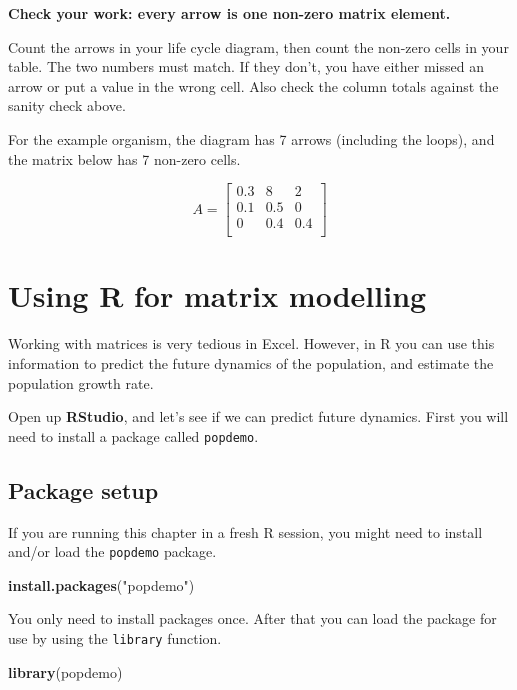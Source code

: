 \documentclass[
  a4paper]{book}
\newenvironment{Shaded}{\begin{snugshade}}{\end{snugshade}}
\newcommand{\FunctionTok}[1]{\textcolor[rgb]{0.13,0.29,0.53}{\textbf{#1}}}
\newcommand{\NormalTok}[1]{#1}
\newcommand{\StringTok}[1]{\textcolor[rgb]{0.31,0.60,0.02}{#1}}
\begin{document}
\textbf{Check your work: every arrow is one non-zero matrix element.}

Count the arrows in your life cycle diagram, then count the non-zero cells in your table. The two numbers must match. If they don't, you have either missed an arrow or put a value in the wrong cell. Also check the column totals against the sanity check above.

For the example organism, the diagram has 7 arrows (including the loops), and the matrix below has 7 non-zero cells.

\[
A = \begin{bmatrix}0.3&8&2 \\0.1&0.5&0 \\0&0.4&0.4 \\\end{bmatrix}
\]

\section{Using R for matrix modelling}\label{using-r-for-matrix-modelling}

Working with matrices is very tedious in Excel. However, in R you can use this information to predict the future dynamics of the population, and estimate the population growth rate.

Open up \textbf{RStudio}, and let's see if we can predict future dynamics. First you will need to install a package called \texttt{popdemo}.

\subsection{Package setup}\label{package-setup}

If you are running this chapter in a fresh R session, you might need to install and/or load the \texttt{popdemo} package.

\begin{Shaded}
\begin{Highlighting}[]
\FunctionTok{install.packages}\NormalTok{(}\StringTok{"popdemo"}\NormalTok{)}
\end{Highlighting}
\end{Shaded}

You only need to install packages once. After that you can load the package for use by using the \texttt{library} function.

\begin{Shaded}
\begin{Highlighting}[]
\FunctionTok{library}\NormalTok{(popdemo)}
\end{Highlighting}
\end{Shaded}
\end{document}
